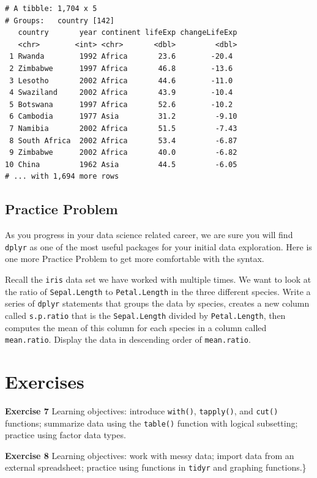 \documentclass[
]{krantz}
\begin{document}
\begin{verbatim}
# A tibble: 1,704 x 5
# Groups:   country [142]
   country       year continent lifeExp changeLifeExp
   <chr>        <int> <chr>       <dbl>         <dbl>
 1 Rwanda        1992 Africa       23.6        -20.4 
 2 Zimbabwe      1997 Africa       46.8        -13.6 
 3 Lesotho       2002 Africa       44.6        -11.0 
 4 Swaziland     2002 Africa       43.9        -10.4 
 5 Botswana      1997 Africa       52.6        -10.2 
 6 Cambodia      1977 Asia         31.2         -9.10
 7 Namibia       2002 Africa       51.5         -7.43
 8 South Africa  2002 Africa       53.4         -6.87
 9 Zimbabwe      2002 Africa       40.0         -6.82
10 China         1962 Asia         44.5         -6.05
# ... with 1,694 more rows
\end{verbatim}

\hypertarget{ch6PP6}{%
\subsection{Practice Problem}\label{ch6PP6}}

As you progress in your data science related career, we are sure you will find \texttt{dplyr} as one of the most useful packages for your initial data exploration. Here is one more Practice Problem to get more comfortable with the syntax.

Recall the \texttt{iris} data set we have worked with multiple times. We want to look at the ratio of \texttt{Sepal.Length} to \texttt{Petal.Length} in the three different species. Write a series of \texttt{dplyr} statements that groups the data by species, creates a new column called \texttt{s.p.ratio} that is the \texttt{Sepal.Length} divided by \texttt{Petal.Length}, then computes the mean of this column for each species in a column called \texttt{mean.ratio}. Display the data in descending order of \texttt{mean.ratio}.

\hypertarget{ch6Ex}{%
\section{Exercises}\label{ch6Ex}}

\textbf{Exercise 7} Learning objectives: introduce \texttt{with()}, \texttt{tapply()}, and \texttt{cut()} functions; summarize data using the \texttt{table()} function with logical subsetting; practice using factor data types.

\textbf{Exercise 8} Learning objectives: work with messy data; import data from an external spreadsheet; practice using functions in \texttt{tidyr} and graphing functions.\}
\end{document}
